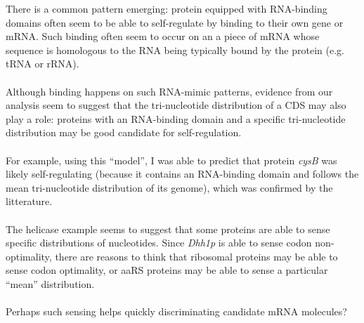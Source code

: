 \documentclass[12pt]{article}
\begin{document}
There is a common pattern emerging: protein equipped with RNA-binding domains often seem to be able to self-regulate by binding to their own gene or mRNA. Such binding often seem to occur on an a piece of mRNA whose sequence is homologous to the RNA being typically bound by the protein (e.g. tRNA or rRNA).\\
\\
Although binding happens on such RNA-mimic patterns, evidence from our analysis seem to suggest that the tri-nucleotide distribution of a CDS may also play a role: proteins with an RNA-binding domain and a specific tri-nucleotide distribution may be good candidate for self-regulation.\\
\\
For example, using this ``model'', I was able to predict that protein \textit{cysB} was likely self-regulating (because it contains an RNA-binding domain and follows the mean tri-nucleotide distribution of its genome), which was confirmed by the litterature.\\
\\
The helicase example seems to suggest that some proteins are able to sense specific distributions of nucleotides. Since \textit{Dhh1p} is able to sense codon non-optimality, there are reasons to think that ribosomal proteins may be able to sense codon optimality, or aaRS proteins may be able to sense a particular ``mean'' distribution.\\
\\
Perhaps such sensing helps quickly discriminating candidate mRNA molecules?

\pagebreak



\end{document}
